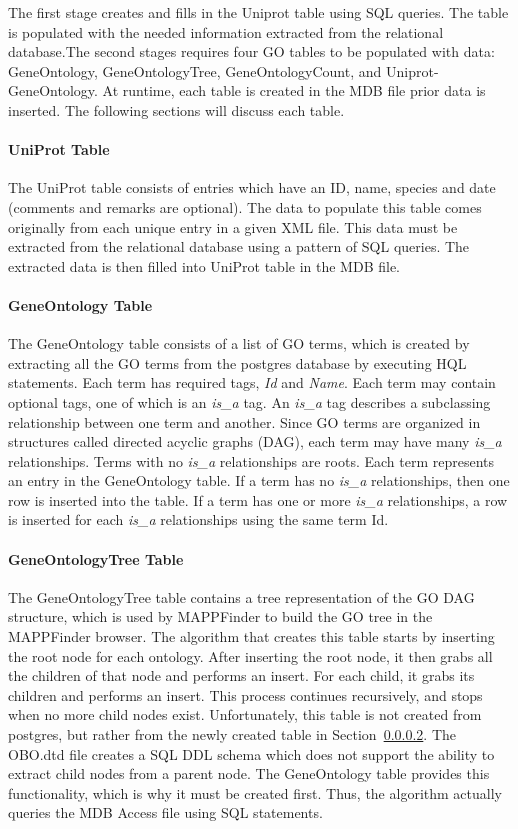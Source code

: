 The first stage creates and fills in the Uniprot table using SQL queries.  The table is populated with the needed information extracted from the relational database.The second stages requires four GO tables to be populated with data: GeneOntology, GeneOntologyTree, GeneOntologyCount, and Uniprot-GeneOntology. At runtime, each table is created in the MDB file prior data is inserted. The following sections will discuss each table.


\paragraph{UniProt Table}
\label{uniprottable}
The UniProt table consists of entries which have an ID, name, species and date (comments and remarks are optional).  The data to populate this table comes originally from each unique entry in a given XML file.  This data must be extracted from the relational database using a pattern of SQL queries.  The extracted data is then filled into UniProt table in the MDB file.

\paragraph{GeneOntology Table}
\label{gotable}
The GeneOntology table consists of a list of GO terms, which is created by extracting all the
GO terms from the postgres database by executing HQL statements. Each term has required tags, \emph{Id} and \emph{Name}.
Each term may contain optional tags, one of which is an \emph{is\_a} tag. An \emph{is\_a} tag describes a
subclassing relationship between one term and another. Since GO terms
are organized in structures called directed acyclic graphs (DAG), each term may have many \emph{is\_a} relationships.
Terms with no \emph{is\_a} relationships are roots. Each term represents an entry in the GeneOntology table. If a term
has no \emph{is\_a} relationships, then one row is inserted into the table. If a term has one or more
\emph{is\_a} relationships, a row is inserted for each \emph{is\_a} relationships using the same term Id.


\paragraph{GeneOntologyTree Table}
The GeneOntologyTree table contains a tree representation of the GO DAG structure, which is used by MAPPFinder
to build the GO tree in the MAPPFinder browser. The algorithm that creates this table starts by inserting the root
node for each ontology. After inserting the root node, it then grabs all the children of that node and performs an insert.
For each child, it grabs its children
and performs an insert. This process continues recursively, and stops when no more child nodes exist.
Unfortunately, this table is not created from postgres, but rather from the
newly created table in Section~\ref{gotable}. The OBO.dtd file creates a SQL DDL schema which does not support
the ability to extract child nodes from a parent node. The GeneOntology table provides this functionality, which
is why it must be created first. Thus, the algorithm actually queries the MDB Access file using SQL statements.



